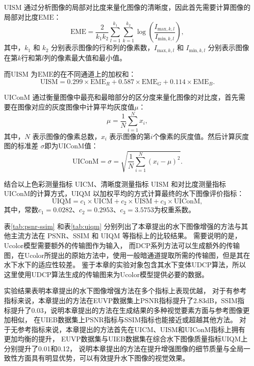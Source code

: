 $\mathrm{UISM}$ 通过分析图像的局部对比度来量化图像的清晰度，因此首先需要计算图像的局部对比度$\mathrm{EME}$：
\begin{equation}
    \mathrm{EME} = \frac{2}{k_1 k_2} \sum_{l=1}^{k_1} \sum_{k=1}^{k_2} \log \left( \frac{I_{\text{max},k,l}}{I_{\text{min},k,l}} \right),
\end{equation}
其中，$k_1$ 和 $k_2$ 分别表示图像的行和列的像素数，$I_{\text{max},k,l}$ 和 $I_{\text{min},k,l}$ 分别表示图像在第$k$行和第$l$列的像素最大值和最小值。

而$\mathrm{UISM}$ 为$\mathrm{EME}$的在不同通道上的加权和：
\begin{equation}
    \mathrm{UISM} = 0.299 \times \mathrm{EME}_{R} + 0.587 \times \mathrm{EME}_{G} + 0.114 \times \mathrm{EME}_{B}.
\end{equation}

$\mathrm{UIConM}$ 通过衡量图像中最亮和最暗部分的区分度来量化图像的对比度，首先需要在图像对应的灰度图像中计算平均灰度值$\mu$：
\begin{equation}
   \mu = \frac{1}{N} \sum_{i=1}^{N} x_i,
\end{equation}
其中，$N$ 表示图像的像素总数，$x_i$ 表示图像的第$i$个像素的灰度值。然后计算灰度图的标准差 \(\sigma\)即为UIConM值：
\begin{equation}
    \mathrm{UIConM}=\sigma = \sqrt{\frac{1}{N} \sum_{i=1}^{N} (x_i - \mu)^2}.
\end{equation}

结合以上色彩测量指标 UICM、清晰度测量指标 UISM 和对比度测量指标 UIConM的计算方式，UIQM 以加权平均的方式计算最终的水下图像评价指标：
\begin{equation}
    \mathrm{UIQM}=c_1 \times \mathrm{UICM}+c_2 \times \mathrm{UISM}+c_3 \times \mathrm{UIConM},
\end{equation}
其中，常数$c_1=0.0282$、$c_2=0.2953$、$c_3=3.5753$为权重系数。

表\ref{tab:psnr-ssim}  和表\ref{tab:uiqm} 分别列出了本章提出的水下图像增强的方法与其他主流方法在 PSNR、SSIM 和 UIQM 等指标上的比较结果。
需要说明的是，Ucolor\cite{ucolor}模型需要额外的传输图作为输入，
而DCP系列方法可以生成额外的传输图，在Ucolor所提出的原始方法中，使用一般暗通道\cite{GDCP}提取所需的传输图，但是其在水下水下的适应性较差。
鉴于本章的实验对象包含其水下变体UDCP\cite{udcp}算法，所以这里使用UDCP算法生成的传输图来为Ucolor模型提供必要的数据。

实验结果表明本章提出的水下图像增强方法在多个指标上表现优越，
对于有参考指标来说，本章提出的方法在EUVP数据集上PSNR指标提升了2.83dB，SSIM指标提升了0.03，说明本章提出的方法在生成结果的多种视觉要素方面与参考图像更加相似，
在UIEB数据集上PSNR指标与SSIM指标也能接近或超越其他方法。
对于无参考指标来说，本章提出的方法首先在UICM、UISM和UIConM指标上拥有更加均衡的提升，
EUVP数据集与UIEB数据集在综合水下图像质量指标UIQM上分别提升了0.01和0.12，
说明本章提出的方法在提升增强图像的细节质量与全局一致性方面具有明显优势，可以有效提升水下图像的视觉效果。


